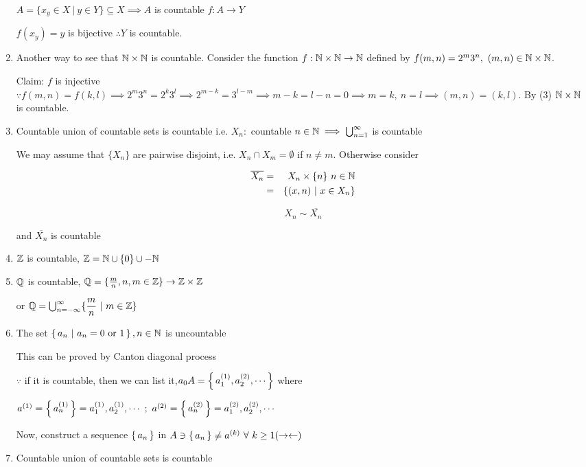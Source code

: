 \begin{enumerate}[wide,label = \textbf{($\arabic*$). }]
	$A = \{x_y \in X ~|~ y \in Y\} \subseteq X \implies A$ is countable $f: A \rightarrow Y$
	
	$ f(x_y) = y$ is bijective $\therefore Y$ is countable.
	\item Another way to see that $\mathbb{N} \times \mathbb{N}$ is countable. Consider the function $f: \mathbb{N} \times \mathbb{N} \rightarrow \mathbb{N}$ defined by $f(m,n) = 2^m3^n,~(m,n) \in \mathbb{N} \times \mathbb{N}$.
	
	Claim: $f$ is injective $\because f(m,n) = f(k,l) \implies 2^m3^n = 2^k3^l \implies 2^{m-k} = 3^{l - m} \implies m - k = l - n = 0 \implies m = k,~n = l \implies (m,n) = (k,l)$. By (3) $\mathbb{N} \times \mathbb{N}$ is countable.
	
	\item Countable union of countable sets is countable i.e. $X_n:$ countable $n \in \mathbb{N} \implies \bigcup^{\infty}_{n=1}$ is countable
	
	We may assume that $\{X_n\}$ are pairwise disjoint, i.e. $X_n \cap X_m = \emptyset$ if $n \neq m$. Otherwise consider
	
	\begin{eqnarray*}
		\overline{X_n} &=& X_n \times \{n\} ~ n \in \mathbb{N} \\
		&=& \{(x,n) ~|~ x \in X_n\}
	\end{eqnarray*}
	
	$$X_n \sim \overline{X_n} $$
	
	and $\overline{X_n}$ is countable
	
	\item $\mathbb{Z}$ is countable, $\mathbb{Z} = \mathbb{N} \cup \{0\} \cup - \mathbb{N}$
	\item $\mathbb{Q}$ is countable, $\mathbb{Q} = \{\frac{m}{n},n,m \in \mathbb{Z}\} \rightarrow \mathbb{Z} \times \mathbb{Z}$
	 
	or $\mathbb{Q} = \bigcup^{\infty}_{n = -\infty} \{\dfrac{m}{n}~|~ m \in \mathbb{Z}\}$ 
	\item The set $\left\{ \,a_n~|~a_n=0\text{ or }1 \,\right\}, n \in \mathbb{N}$ is uncountable
	
	This can be proved by Canton diagonal process
	
	$\because$ if it is countable, then we can list it,$a_0 A = \left\{ \,a^{(1)}_1,a^{(2)}_2,\cdots \,\right\}$ where
	
	$a^{(1)} = \left\{ \,a_n^{(1)} \,\right\} = a^{(1)}_{1},a^{(1)}_2,\cdots~;~a^{(2)} = \left\{ \,a_n^{(2)} \,\right\} = a^{(2)}_{1},a^{(2)}_2,\cdots$
	
	Now, construct a sequence $\left\{ \,a_n \,\right\}$ in $A \ni \left\{ \,a_n \,\right\} \neq a^{(k)} ~\forall~k\geq 1 (\rightarrow\leftarrow)$
	
	\item Countable union of countable sets is countable
\end{enumerate} 

